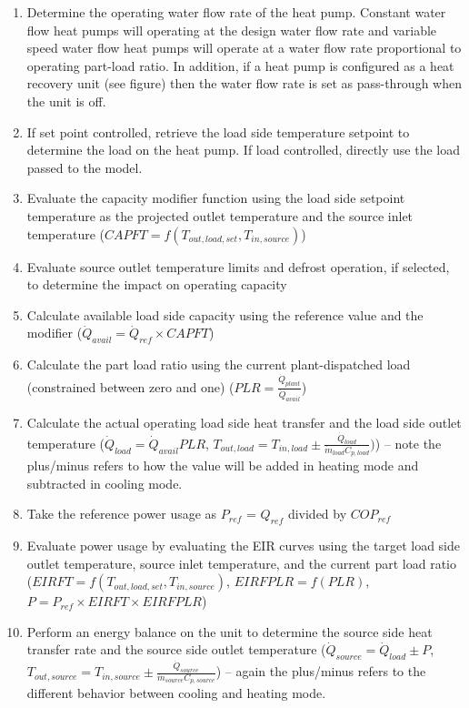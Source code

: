 \begin{enumerate}
      \item Determine the operating water flow rate of the heat pump. Constant water flow heat pumps will operating at the design water flow rate and variable speed water flow heat pumps will operate at a water flow rate proportional to operating part-load ratio. In addition, if a heat pump is configured as a heat recovery unit (see figure) then the water flow rate is set as pass-through when the unit is off.
	\item If set point controlled, retrieve the load side temperature setpoint to determine the load on the heat pump. If load controlled, directly use the load passed to the model. 
	\item Evaluate the capacity modifier function using the load side setpoint temperature as the projected outlet temperature and the source inlet temperature ($CAPFT = f(T_{out,load,set}, T_{in,source}) $)
     \item Evaluate source outlet temperature limits and defrost operation, if selected, to determine the impact on operating capacity
	\item Calculate available load side capacity using the reference value and the modifier ($\dot{Q}_{avail} = \dot{Q}_{ref} \times CAPFT$)
	\item Calculate the part load ratio using the current plant-dispatched load (constrained between zero and one) ($PLR = \frac{\dot{Q}_{plant}}{\dot{Q}_{avail}}$)
	\item Calculate the actual operating load side heat transfer and the load side outlet temperature ($\dot{Q}_{load} = \dot{Q}_{avail}PLR$, $T_{out,load} = T_{in,load} \pm \frac{\dot{Q}_{load}}{\dot{m}_{load}C_{p,load}}) $) -- note the plus/minus refers to how the value will be added in heating mode and subtracted in cooling mode.
     \item Take the reference power usage as $P_{ref}$ = $Q_{ref}$ divided by $COP_{ref}$
	\item Evaluate power usage by evaluating the EIR curves using the target load side outlet temperature, source inlet temperature, and the current part load ratio ($EIRFT = f(T_{out,load,set}, T_{in,source})$, $EIRFPLR = f(PLR)$, $P = P_{ref} \times EIRFT \times EIRFPLR$)
	\item Perform an energy balance on the unit to determine the source side heat transfer rate and the source side outlet temperature ($\dot{Q}_{source} = \dot{Q}_{load} \pm P$, $T_{out,source} = T_{in,source} \pm \frac{\dot{Q}_{source}}{\dot{m}_{source}C_{p,source}} $) -- again the plus/minus refers to the different behavior between cooling and heating mode.
\end{enumerate}

